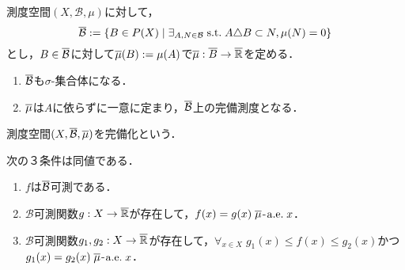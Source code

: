 \documentclass[uplatex, dvipdfmx]{jsreport}
\renewcommand{\B}{\mathcal{B}}
\begin{document}
\begin{theorem}[completion]\label{thm-completion}
    測度空間$(X,\B,\mu)$に対して，
    \[\o{\B}:=\Brace{B\in P(X)\mid \exists_{A,N\in\B}\st A\triangle B\subset N,\mu(N)=0}\]
    とし，$B\in\o{\B}$に対して$\overline{\mu}(B):=\mu(A)$で$\overline{\mu}:\overline{B}\to\overline{\mathbb{R}}$を定める．
    \begin{enumerate}
        \item $\o{\B}$も$\sigma$-集合体になる．
        \item $\overline{\mu}$は$A$に依らずに一意に定まり，$\o{\B}$上の完備測度となる．
    \end{enumerate}
    測度空間$(X,\o{\B},\o{\mu})$を完備化という．
\end{theorem}

\begin{proposition}[完備化可測性の特徴付け]\label{prop-characterization-of-measurability-on-complete-space}
    次の３条件は同値である．
    \begin{enumerate}
        \item $f$は$\o{\B}$可測である．
        \item $\B$可測関数$g:X\to\overline{\mathbb{R}}$が存在して，$f(x)=g(x)\;\overline{\mu}$-$\mathrm{a.e.}\; x$．
        \item $\B$可測関数$g_1,g_2:X\to\overline{\mathbb{R}}$が存在して，$\forall_{x\in X}\;g_1(x)\le f(x)\le g_2(x)$かつ$g_1(x)=g_2(x)\;\overline{\mu}$-$\mathrm{a.e.}\; x$．
    \end{enumerate}
\end{proposition}
\end{document}
